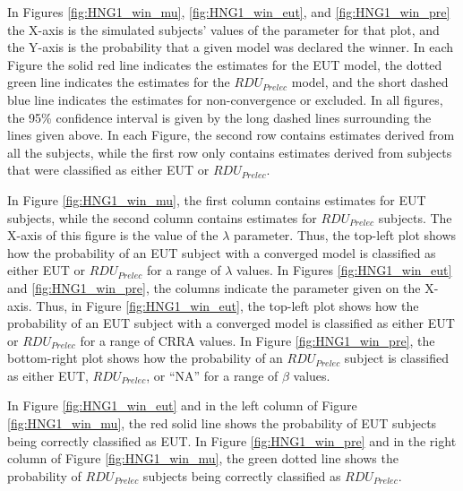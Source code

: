 \documentclass[../main.tex]{subfiles}
\begin{document}
In Figures \ref{fig:HNG1_win_mu}, \ref{fig:HNG1_win_eut}, and \ref{fig:HNG1_win_pre} the X-axis is the simulated subjects' values of the parameter for that plot, and the Y-axis is the probability that a given model was declared the winner.
In each Figure the solid red line indicates the estimates for the EUT model, the dotted green line indicates the estimates for the $\mathit{RDU_{Prelec}}$ model, and the short dashed blue line indicates the estimates for non-convergence or excluded.
In all figures, the 95\% confidence interval is given by the long dashed lines surrounding the lines given above.
In each Figure, the second row contains estimates derived from all the subjects, while the first row only contains estimates derived from subjects that were classified as either EUT or $\mathit{RDU_{Prelec}}$.

In Figure \ref{fig:HNG1_win_mu}, the first column contains estimates for EUT subjects, while the second column contains estimates for $\mathit{RDU_{Prelec}}$ subjects.
The X-axis of this figure is the value of the $\lambda$ parameter.
Thus, the top-left plot shows how the probability of an EUT subject with a converged model is classified as either EUT or $\mathit{RDU_{Prelec}}$ for a range of $\lambda$ values.
In Figures \ref{fig:HNG1_win_eut} and \ref{fig:HNG1_win_pre}, the columns indicate the parameter given on the X-axis.
Thus, in Figure \ref{fig:HNG1_win_eut}, the top-left plot shows how the probability of an EUT subject with a converged model is classified as either EUT or $\mathit{RDU_{Prelec}}$ for a range of CRRA values.
In Figure \ref{fig:HNG1_win_pre}, the bottom-right plot shows how the probability of an $\mathit{RDU_{Prelec}}$ subject is classified as either EUT, $\mathit{RDU_{Prelec}}$, or \enquote{NA} for a range of $\beta$ values.

In Figure \ref{fig:HNG1_win_eut} and in the left column of Figure \ref{fig:HNG1_win_mu}, the red solid line shows the probability of EUT subjects being correctly classified as EUT.
In Figure \ref{fig:HNG1_win_pre} and in the right column of Figure \ref{fig:HNG1_win_mu}, the green dotted line shows the probability of $\mathit{RDU_{Prelec}}$ subjects being correctly classified as $\mathit{RDU_{Prelec}}$.
\end{document}
